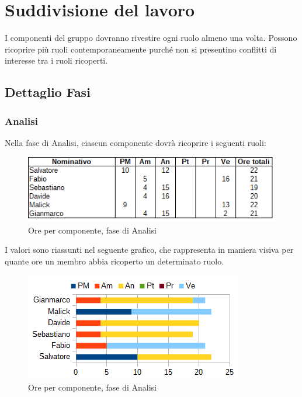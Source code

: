 \section{Suddivisione del lavoro}
I componenti del gruppo dovranno rivestire ogni ruolo almeno una volta. Possono ricoprire più ruoli contemporaneamente purché non si presentino conflitti di interesse tra i ruoli ricoperti.
	\subsection{Dettaglio Fasi}
		\subsubsection{Analisi}
		Nella fase di Analisi, ciascun componente dovrà ricoprire i seguenti ruoli: \\
		\begin{figure}[H]
			\centering
			\includegraphics[scale=0.75]{immagini/tabelle/analisi.png}
			\caption{Ore per componente, fase di Analisi}
		\end{figure}
		I valori sono riassunti nel seguente grafico, che rappresenta in maniera visiva per quante ore un membro abbia ricoperto un determinato ruolo. \\
		\begin{figure}[H]
			\centering
			\includegraphics[scale=1]{immagini/grafici/analisi-barra.png}
			\caption{Ore per componente, fase di Analisi}
		\end{figure}
